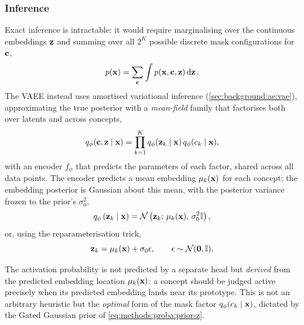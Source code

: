 \subsubsection{Inference} \label{sec:methods:model:proba:inference}
Exact inference is intractable: it would require marginalising over the
continuous embeddings $\vb{z}$ and summing over all $2^K$ possible discrete
mask configurations for $\vb{c}$,
\begin{equation*}
    p(\vb{x}) = \sum_{\vb{c}} \int p(\vb{x}, \vb{c}, \vb{z}) \dd{\vb{z}}.
\end{equation*}
The \ac{VAEE} instead uses amortised variational inference
(\cref{sec:background:ae:vae}),
approximating the true posterior with a \textit{mean-field} family that
factorises both over latents and across concepts,
\begin{equation} \label{eq:methods:proba:posterior}
    q_\phi(\vb{c}, \vb{z} \mid \vb{x}) = \prod_{k=1}^{K}
    q_\phi(\vb{z}_k \mid \vb{x})\, q_\phi(c_k \mid \vb{x}),
\end{equation}
with an encoder $f_\phi$ that predicts the parameters of each factor, shared
across all data points. The encoder predicts a mean embedding
$\vb{\mu}_k(\vb{x})$ for each concept; the embedding posterior is Gaussian
about this mean, with the posterior variance frozen to the prior's $\sigma_0^2$,
\begin{equation} \label{eq:methods:proba:posterior-z}
    q_{\phi}\left(\vb{z}_{k} \mid \vb{x}\right) =
    \mathcal{N}\left(\vb{z}_{k}; \,\vb{\mu}_{k}(\vb{x}), \,\sigma^{2}_{0}
    \mathbb{I}\right),
\end{equation}
or, using the reparameterisation trick,
\begin{equation*}
    \vb{z}_{k} = \vb{\mu}_{k}(\vb{x}) + \sigma_{0} \vb{\epsilon}, \qquad
    \vb{\epsilon} \sim \mathcal{N}(\vb{0}, \mathbb{I}).
\end{equation*}

The activation probability is not predicted by a separate head but
\textit{derived} from the predicted embedding location $\vb{\mu}_k(\vb{x})$: a
concept should be judged active precisely when its predicted embedding lands
near its prototype. This is not an arbitrary heuristic but the \textit{optimal}
form of the mask factor $q_\phi(c_k \mid \vb{x})$, dictated by the Gated
Gaussian prior of \cref{eq:methods:proba:prior-z}.

